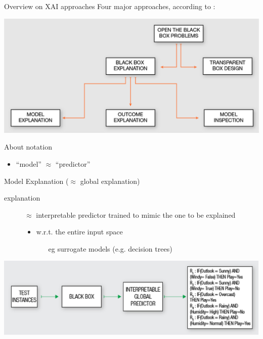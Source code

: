 \documentclass[presentation]{beamer}\mode<presentation>{\usetheme{AMSBolognaFC}}
\begin{document}
\begin{frame}[allowframebreaks]{Overview on XAI approaches}
    Four major approaches, according to \cite{guidotti2018survey}:
    \begin{center}
        \includegraphics[width=.8\linewidth]{figures/open-bb.png}
    \end{center}

    \begin{block}{About notation}
        \begin{itemize}
            \item ``model'' $\approx$ ``predictor''
        \end{itemize}
    \end{block}
    
    \framebreak

    \begin{block}{Model Explanation ($\approx$ global explanation)}
        \begin{description}
            \item[explanation] $\approx$ interpretable predictor trained to mimic the one to be explained 
            \begin{itemize}
                \item w.r.t. the entire input space
                \begin{itemize}
                    \item[eg] surrogate models (e.g. decision trees)
                \end{itemize}
            \end{itemize}
        \end{description}
    \end{block}
    \begin{center}
        \includegraphics[width=.8\linewidth]{figures/model-explanation.png}
    \end{center}


\end{frame}
\end{document}
